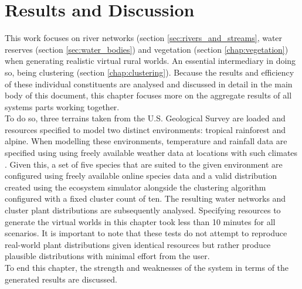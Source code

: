 \chapter{Results and Discussion}

This work focuses on river networks (section \ref{sec:rivers_and_streams}, water reserves (section \ref{sec:water_bodies}) and vegetation (section \ref{chap:vegetation}) when generating realistic virtual rural worlds. An essential intermediary in doing so, being clustering (section \ref{chap:clustering}). Because the results and efficiency of these individual constituents are analysed and discussed in detail in the main body of this document, this chapter focuses more on the aggregate results of all systems parts working together. \\

To do so, three terrains taken from the U.S. Geological Survey \protect\footnotemark {} are loaded and resources specified to model two distinct environments: tropical rainforest and alpine. When modelling these environments, temperature and rainfall data are specified using using freely available weather data at locations with such climates \protect\footnotemark {}. Given this, a set of five species that are suited to the given environment are configured using freely available online species data  \protect\footnotemark {} and a valid distribution created using the ecosystem simulator alongside the clustering algorithm configured with a fixed cluster count of ten. The resulting water networks and cluster plant distributions are subsequently analysed. Specifying resources to generate the virtual worlds in this chapter took less than 10 minutes for all scenarios. It is important to note that these tests do not attempt to reproduce real-world plant distributions given identical resources but rather produce plausible distributions with minimal effort from the user. \\

To end this chapter, the strength and weaknesses of the system in terms of the generated results are discussed.\\
